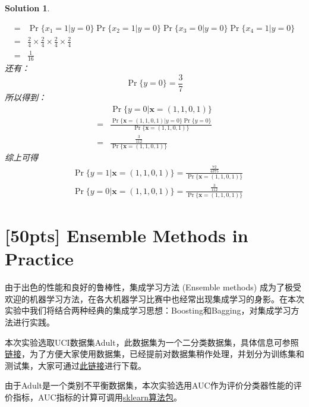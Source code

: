 \documentclass[a4paper,UTF8]{article}
\numberwithin{equation}{section}
\newtheorem*{mySol}{Solution}
\begin{document}
\begin{mySol}
\begin{enumerate}[ {(}1{)}]
\begin{equation}
\begin{aligned}
=& \Pr\{x_1 = 1 | y = 0\}\Pr\{x_2 = 1 | y = 0\}\Pr\{x_3 = 0 | y = 0\}\Pr\{x_4 = 1 | y = 0\}\\
=& \frac{2}{4}\times\frac{2}{4}\times\frac{2}{4}\times\frac{2}{4}\\
=& \frac{1}{16}
\end{aligned}
\end{equation}
还有：
\begin{equation}
\Pr\{y=0\} = \frac{3}{7}
\end{equation}
所以得到：
\begin{equation}
\begin{aligned}
&\Pr\{ y=0 | \mathbf{x}=(1,1,0,1) \}\\ 
=& \frac{\Pr\{\mathbf{x}=(1,1,0,1) | y=0  \} \Pr\{y=0\}}{\Pr\{\mathbf{x}=(1,1,0,1) \}}\\
=& \frac{\frac{3}{112}}{\Pr\{\mathbf{x}=(1,1,0,1)\}}
\end{aligned}
\end{equation}
综上可得
\begin{equation}
\begin{aligned}
&\Pr\{ y=1 | \mathbf{x}=(1,1,0,1) \} = \frac{\frac{72}{4375}}{\Pr\{\mathbf{x}=(1,1,0,1)\}}\\
&\Pr\{ y=0 | \mathbf{x}=(1,1,0,1) \} = \frac{\frac{3}{112}}{\Pr\{\mathbf{x}=(1,1,0,1)\}}
\end{aligned}
\end{equation}
\end{enumerate}	

\end{mySol}
\newpage	
\section{[50pts] Ensemble Methods in Practice}

由于出色的性能和良好的鲁棒性，集成学习方法 (Ensemble methods) 成为了极受欢迎的机器学习方法，在各大机器学习比赛中也经常出现集成学习的身影。在本次实验中我们将结合两种经典的集成学习思想：Boosting和Bagging，对集成学习方法进行实践。

本次实验选取UCI数据集Adult，此数据集为一个二分类数据集，具体信息可参照\href{http://archive.ics.uci.edu/ml/datasets/Adult}{链接}，为了方便大家使用数据集，已经提前对数据集稍作处理，并划分为训练集和测试集，大家可通过\href{ftp://lamda.nju.edu.cn/ml2018/PS5/adult_dataset.zip}{此链接}进行下载。

由于Adult是一个类别不平衡数据集，本次实验选用AUC作为评价分类器性能的评价指标，AUC指标的计算可调用\href{http://scikit-learn.org/stable/modules/generated/sklearn.metrics.roc_auc_score.html}{sklearn算法包}。
\end{document}
